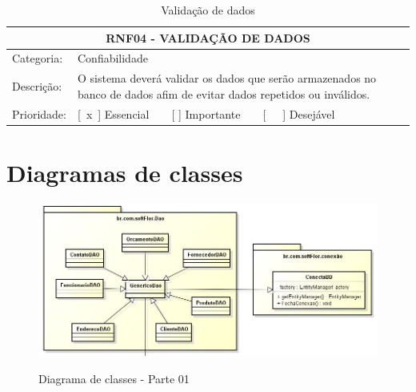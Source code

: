 \begin{anexosenv}
\begin{table}[htbp]
	\centering
	\caption{Validação de dados}
	\label{tab:rnf04}
	\begin{tabular}{l p{10cm}}
		\toprule
		\multicolumn{2}{c}{RNF04 - VALIDAÇÃO DE DADOS} \\ \midrule
		Categoria:  & Confiabilidade\\ \midrule
		Descrição:  & O sistema deverá validar os dados que serão armazenados no banco de dados afim de evitar dados repetidos ou inválidos.\\ \midrule
		Prioridade: & [ x ] Essencial    [   ] Importante    [   ] Desejável \\ \bottomrule
	\end{tabular}
\end{table}


\chapter{Diagramas de classes}

\begin{figure}[H]
\centering
\caption{Diagrama de classes - Parte 01}
\includegraphics[width=14cm]{imagens/diagramas/Classes02}
\label{fig:Diagrama de classes 01}
\end{figure}


\end{anexosenv}
